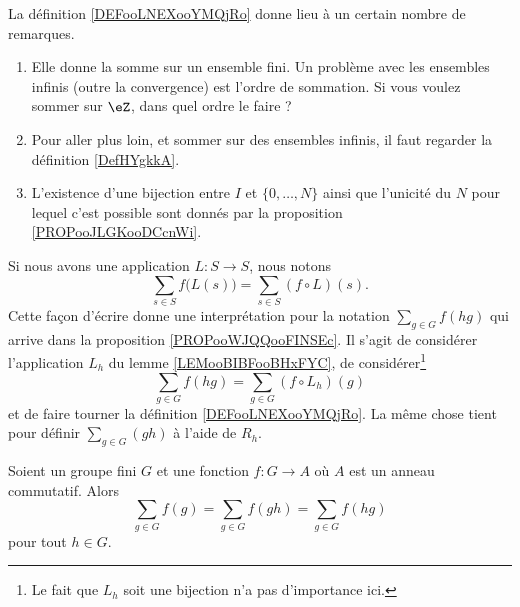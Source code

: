 La définition \ref{DEFooLNEXooYMQjRo} donne lieu à un certain nombre de remarques.
\begin{enumerate}
    \item
        Elle donne la somme sur un ensemble fini. Un problème avec les ensembles infinis (outre la convergence) est l'ordre de sommation. Si vous voulez sommer sur \( \eZ\), dans quel ordre le faire ?
    \item
        Pour aller plus loin, et sommer sur des ensembles infinis, il faut regarder la définition \ref{DefHYgkkA}. 
    \item
        L'existence d'une bijection entre \( I\) et \( \{ 0,\ldots, N \}\) ainsi que l'unicité du \( N\) pour lequel c'est possible sont donnés par la proposition \ref{PROPooJLGKooDCcnWi}.
\end{enumerate}

Si nous avons une application \( L\colon S\to S\), nous notons
\begin{equation}
    \sum_{s\in S}f\big( L(s) \big)=\sum_{s\in S}(f\circ L)(s).
\end{equation}
Cette façon d'écrire donne une interprétation pour la notation \( \sum_{g\in G}f(hg)\) qui arrive dans la proposition \ref{PROPooWJQQooFINSEc}. Il s'agit de considérer l'application \( L_h\) du lemme \ref{LEMooBIBFooBHxFYC}, de considérer\footnote{Le fait que \( L_h\) soit une bijection n'a pas d'importance ici.}
\begin{equation}        \label{EQooQQBEooFDOBVG}
    \sum_{g\in G}f(hg)=\sum_{g\in G}(f\circ L_h)(g)
\end{equation}
et de faire tourner la définition \ref{DEFooLNEXooYMQjRo}. La même chose tient pour définir \( \sum_{g\in G}(gh)\) à l'aide de \( R_h\).

\begin{proposition}     \label{PROPooWJQQooFINSEc}
    Soient un groupe fini \( G\) et une fonction \( f\colon G\to A\) où \( A\) est un anneau commutatif. Alors
    \begin{equation}
        \sum_{g\in G}f(g)=\sum_{g\in G}f(gh)=\sum_{g\in G}f(hg)
    \end{equation}
    pour tout \( h\in G\).
\end{proposition}

